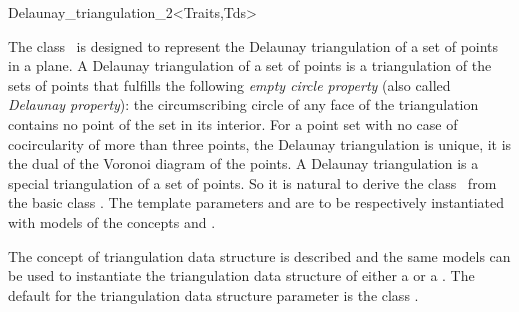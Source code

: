 

\begin{ccRefClass}{Delaunay_triangulation_2<Traits,Tds>}  %


\ccDefinition
  
The class \ccRefName\ is designed to represent
the Delaunay triangulation of a set of points in a plane.
A  Delaunay triangulation of a set of points
is a triangulation of the sets of points that fulfills
the following {\em empty circle property} 
(also called {\em Delaunay property}): the circumscribing
circle of any face
of the triangulation contains no point of the set in its interior.
For a point set with no case of cocircularity 
of more than three points,
the Delaunay triangulation is unique, it is  the dual
of the Voronoi diagram of the points.
A Delaunay triangulation is a special triangulation of a set of points.
So it is natural to derive  the class \ccRefName\
from the basic class .
The template parameters  and  
are to be respectively instantiated with models of the concepts
  and
.

The concept of triangulation data structure
is described 
and the same models can be used to instantiate the
triangulation data structure of either a 
or a \ccRefName. 
The  default for the triangulation data structure parameter is the class
.


\end{ccRefClass}
